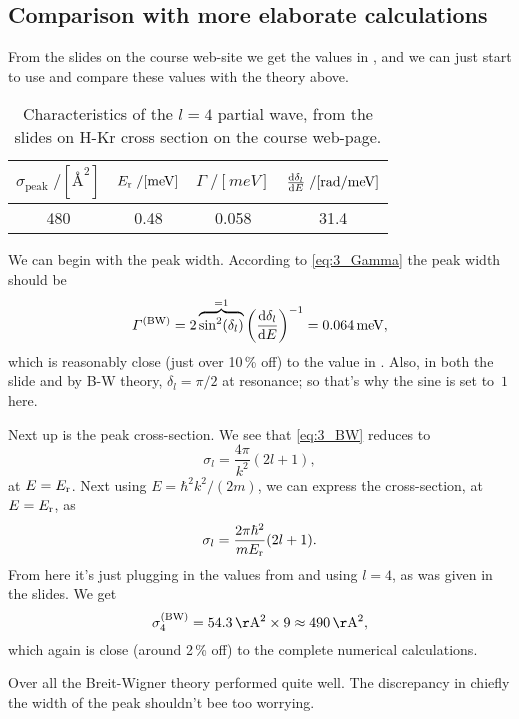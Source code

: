 \documentclass[11pt,letter, swedish, english
]{article}
\begin{document}
\subsection{Comparison with more elaborate calculations}
From the slides on the course web-site we get the values in
, and we can just start to use and compare these values
with the theory above.

\begin{table}\centering
\caption{Characteristics of the $l=4$ partial wave, from the slides on
H-Kr cross section on the course web-page.}
\label{tab:3}
\begin{tabular}{|c|c|c|c|}\hline
$\sigma_\text{peak}\;/[\unit{Å^2}]$  & $\Er\;/[\unit{meV}]$ &
$\varGamma\;/[\unit{meV}]$  & $\dv{\delta_l}{E}\;/[\unit{rad/meV}]$ 
\\ \hline
480 & 0.48 & 0.058 & 31.4\\ \hline
\end{tabular}
\end{table}

We can begin with the peak width. According to \eqref{eq:3_Gamma} the
peak width should be
\begin{equation}
\varGamma^\BW=2\overbrace{\sin^2(\delta_l)}^{=1}
\qty(\dv{\delta_l}{E})^{-1}
=\unit[0.064]{meV},
\end{equation}
which is reasonably close (just over 10\,\% off) to the value in
. Also, in both the slide and by B-W theory,
$\delta_l=\pi/2$ at resonance; so that's why the sine is set to~$1$ here.

Next up is the peak cross-section. We see that \eqref{eq:3_BW} reduces
to
\begin{equation}
\sigma_l=\frac{4\pi}{k^2} (2l+1),
\end{equation}
at $E=E_{\text{r}}$. Next using $E=\hbar^2k^2/(2m)$, we can express the
cross-section, at $E=E_{\text{r}}$, as
\begin{equation}\label{eq:3_BW_Er}
\sigma_l=\frac{2\pi\hbar^2}{mE_{\text{r}}} (2l+1).
\end{equation}
From here it's just plugging in the values from  and
using $l=4$, as was given in the slides. We get
\begin{equation}
\sigma_4^{\BW}=\unit[54.3]{Å^2}\times9\approx\unit[490]{Å^2},
\end{equation}
which again is close (around 2\,\% off) to the complete numerical
calculations. 

Over all the Breit-Wigner theory performed quite well. The discrepancy
in chiefly the width of the peak shouldn't bee too worrying. 
\end{document}
